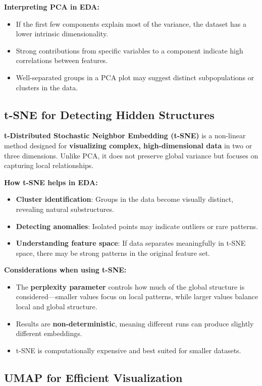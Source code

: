 \documentclass[12pt,openany]{book}
\begin{document}
\textbf{Interpreting PCA in EDA:}
\begin{itemize}
    \item If the first few components explain most of the variance, the dataset has a lower intrinsic dimensionality.
    \item Strong contributions from specific variables to a component indicate high correlations between features.
    \item Well-separated groups in a PCA plot may suggest distinct subpopulations or clusters in the data.
\end{itemize}


\subsection{t-SNE for Detecting Hidden Structures}

\textbf{t-Distributed Stochastic Neighbor Embedding (t-SNE)} is a non-linear method designed for \textbf{visualizing complex, high-dimensional data} in two or three dimensions. Unlike PCA, it does not preserve global variance but focuses on capturing local relationships.

\textbf{How t-SNE helps in EDA:}
\begin{itemize}
    \item \textbf{Cluster identification}: Groups in the data become visually distinct, revealing natural substructures.
    \item \textbf{Detecting anomalies}: Isolated points may indicate outliers or rare patterns.
    \item \textbf{Understanding feature space}: If data separates meaningfully in t-SNE space, there may be strong patterns in the original feature set.
\end{itemize}

\textbf{Considerations when using t-SNE:}
\begin{itemize}
    \item The \textbf{perplexity parameter} controls how much of the global structure is considered—smaller values focus on local patterns, while larger values balance local and global structure.
    \item Results are \textbf{non-deterministic}, meaning different runs can produce slightly different embeddings.
    \item t-SNE is computationally expensive and best suited for smaller datasets.
\end{itemize}


\subsection{UMAP for Efficient Visualization}
\end{document}
